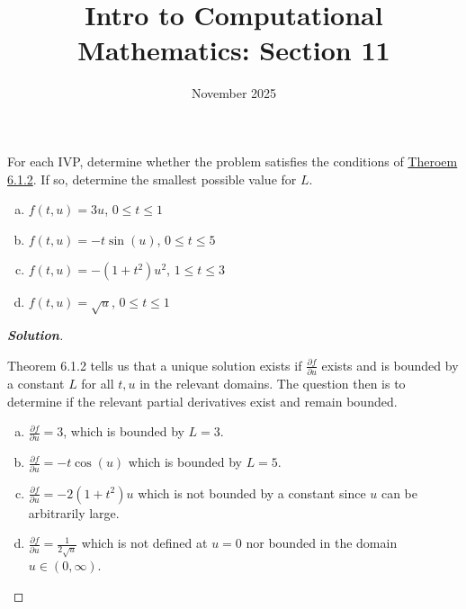 \documentclass[11pt]{article}
\title{Intro to Computational Mathematics: Section 11}
\date{November 2025}
\newenvironment{problem}[2][Question]{\begin{trivlist}
\item[\hskip \labelsep {\bfseries #1}\hskip \labelsep {\bfseries #2.}]}{\end{trivlist}}
\newenvironment{solution}{%
  \begin{proof}[\textbf{Solution}]$ $\par\nobreak\ignorespaces
}{%
  \end{proof}
}
\theoremstyle{definition}
\begin{document}
\maketitle

\begin{problem}{6.1.1}
For each IVP, determine whether the problem satisfies the conditions of \href{https://fncbook.com/basics/#theorem-depic}{Theroem 6.1.2}. If so, determine the smallest possible value for $L$.
\begin{enumerate}[(a)]
\item $f(t, u) = 3u$, $0 \leq t \leq 1$
\item $f(t, u) = -t\sin(u)$, $0 \leq t \leq 5$
\item $f(t, u) = -(1 + t^2)u^2$, $1 \leq t \leq 3$
\item $f(t, u) = \sqrt{u}$, $0 \leq t \leq 1$
\end{enumerate}
\end{problem}
\begin{solution}
Theorem 6.1.2 tells us that a unique solution exists if $\frac{\partial f}{\partial u}$ exists and is bounded by a constant $L$ for all $t, u$ in the relevant domains. The question then is to determine if the relevant partial derivatives exist and remain bounded.
\begin{enumerate}[(a)]
    \item $\frac{\partial f}{\partial u} = 3$, which is bounded by $L = 3$.
    \item $\frac{\partial f}{\partial u} = -t\cos(u)$ which is bounded by $L = 5$.
    \item $\frac{\partial f}{\partial u} = -2(1 + t^2)u$ which is not bounded by a constant since $u$ can be arbitrarily large.
    \item $\frac{\partial f}{\partial u} = \frac{1}{2\sqrt{u}}$ which is not defined at $u = 0$ nor bounded in the domain $u \in (0, \infty)$.
\end{enumerate}
\end{solution}
\end{document}
